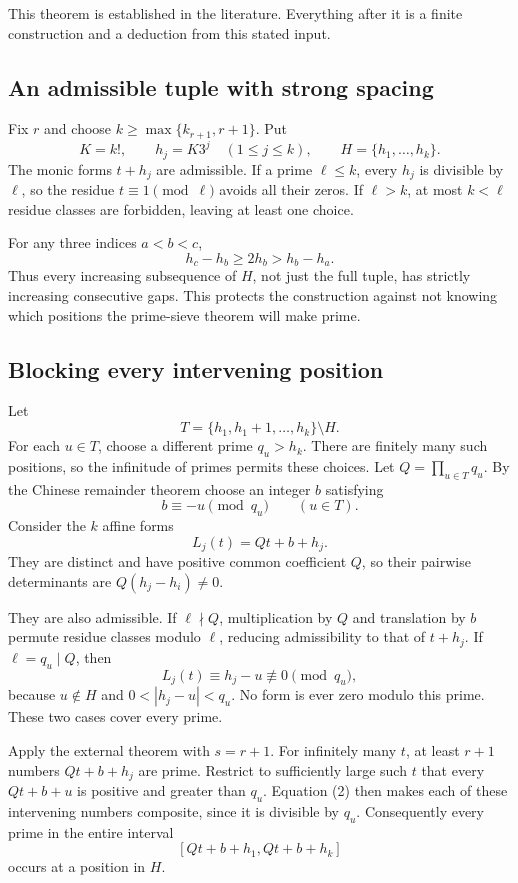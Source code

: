 This theorem is established in the literature. Everything after it is a finite construction and a deduction from this stated input.

\subsection{An admissible tuple with strong spacing}
Fix $r$ and choose $k\ge\max\{k_{r+1},r+1\}$. Put
\[
 K=k!,\qquad h_j=K3^j\quad(1\le j\le k),\qquad H=\{h_1,\ldots,h_k\}.
\]
The monic forms $t+h_j$ are admissible. If a prime $\ell\le k$, every $h_j$ is divisible by $\ell$, so the residue $t\equiv1\pmod\ell$ avoids all their zeros. If $\ell>k$, at most $k<\ell$ residue classes are forbidden, leaving at least one choice.

For any three indices $a<b<c$,
\[
 h_c-h_b\ge2h_b>h_b-h_a.
\tag{1}
\]
Thus every increasing subsequence of $H$, not just the full tuple, has strictly increasing consecutive gaps. This protects the construction against not knowing which positions the prime-sieve theorem will make prime.

\subsection{Blocking every intervening position}
Let
\[
 T=\{h_1,h_1+1,\ldots,h_k\}\setminus H.
\]
For each $u\in T$, choose a different prime $q_u>h_k$. There are finitely many such positions, so the infinitude of primes permits these choices. Let $Q=\prod_{u\in T}q_u$. By the Chinese remainder theorem choose an integer $b$ satisfying
\[
 b\equiv-u\pmod{q_u}\qquad(u\in T).
\tag{2}
\]
Consider the $k$ affine forms
\[
 L_j(t)=Qt+b+h_j.
\]
They are distinct and have positive common coefficient $Q$, so their pairwise determinants are $Q(h_j-h_i)\ne0$.

They are also admissible. If $\ell\nmid Q$, multiplication by $Q$ and translation by $b$ permute residue classes modulo $\ell$, reducing admissibility to that of $t+h_j$. If $\ell=q_u\mid Q$, then
\[
 L_j(t)\equiv h_j-u\not\equiv0\pmod{q_u},
\]
because $u\notin H$ and $0<|h_j-u|<q_u$. No form is ever zero modulo this prime. These two cases cover every prime.

Apply the external theorem with $s=r+1$. For infinitely many $t$, at least $r+1$ numbers $Qt+b+h_j$ are prime. Restrict to sufficiently large such $t$ that every $Qt+b+u$ is positive and greater than $q_u$. Equation (2) then makes each of these intervening numbers composite, since it is divisible by $q_u$. Consequently every prime in the entire interval
\[
 [Qt+b+h_1,Qt+b+h_k]
\]
occurs at a position in $H$.

